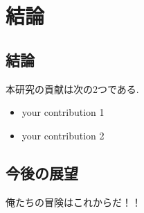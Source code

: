 \chapter{結論}

\section{結論}
本研究の貢献は次の2つである.
\begin{itemize}
	\item your contribution 1
	\item your contribution 2
\end{itemize}

\section{今後の展望}
俺たちの冒険はこれからだ！！